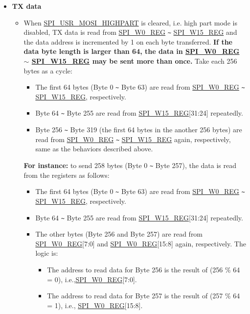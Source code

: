 \documentclass[main\_\_EN.tex]{subfiles}
\begin{document}
\begin{itemize}
    \item \textbf{TX data}
    \begin{itemize}
        \item When \hyperref[fielddesc:SPIUSRMOSIHIGHPART]{SPI\_USR\_MOSI\_HIGHPART} is cleared, i.e. high part mode is disabled, TX data is read from \hyperref[regdesc:SPIW0REG]{SPI\_W0\_REG} \verb+~+ \hyperref[regdesc:SPIW15REG]{SPI\_W15\_REG} and the data address is incremented by 1 on each byte transferred. \textbf{If the data byte length is larger than 64, the data in \hyperref[regdesc:SPIW0REG]{SPI\_W0\_REG} $\sim$ \hyperref[regdesc:SPIW15REG]{SPI\_W15\_REG} may be sent more than once.} Take each 256 bytes as a cycle:
        \begin{itemize}
            \item The first 64 bytes (Byte 0 \verb+~+ Byte 63) are read from \hyperref[regdesc:SPIW0REG]{SPI\_W0\_REG} \verb+~+ \hyperref[regdesc:SPIW15REG]{SPI\_W15\_REG}, respectively.
            \item Byte 64 \verb+~+ Byte 255 are read from  \hyperref[regdesc:SPIW15REG]{SPI\_W15\_REG}[31:24] repeatedly.
            \item Byte 256 \verb+~+ Byte 319 (the first 64 bytes in the another 256 bytes) are read from \hyperref[regdesc:SPIW0REG]{SPI\_W0\_REG} \verb+~+ \hyperref[regdesc:SPIW15REG]{SPI\_W15\_REG} again, respectively, same as the behaviors described above.
        \end{itemize}
        \textbf{For instance:} to send 258 bytes (Byte 0 \verb+~+ Byte 257), the data is read from the registers as follows:
        \begin{itemize}
            \item The first 64 bytes (Byte 0 \verb+~+ Byte 63) are read from \hyperref[regdesc:SPIW0REG]{SPI\_W0\_REG} \verb+~+ \hyperref[regdesc:SPIW15REG]{SPI\_W15\_REG}, respectively.
            \item Byte 64 \verb+~+ Byte 255 are read from \hyperref[regdesc:SPIW15REG]{SPI\_W15\_REG}[31:24] repeatedly.
            \item The other bytes (Byte 256 and Byte 257) are read from \hyperref[regdesc:SPIW0REG]{SPI\_W0\_REG}[7:0] and \hyperref[regdesc:SPIW0REG]{SPI\_W0\_REG}[15:8] again, respectively. The logic is:
            \begin{itemize}
                \item The address to read data for Byte 256 is the result of (256 \% 64 = 0), i.e.,\hyperref[regdesc:SPIW0REG]{SPI\_W0\_REG}[7:0].
                \item The address to read data for Byte 257 is the result of (257 \% 64 = 1), i.e., \hyperref[regdesc:SPIW0REG]{SPI\_W0\_REG}[15:8].
            \end{itemize}
        \end{itemize}



\end{itemize}
\end{itemize}
\end{document}
